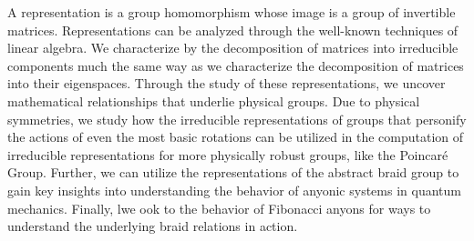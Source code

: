A representation is a group homomorphism whose image is a group of invertible matrices. Representations can be analyzed through the well-known techniques of linear algebra. We characterize by the decomposition of matrices into irreducible components much the same way as we characterize the decomposition of matrices into their eigenspaces. Through the study of these representations, we uncover mathematical relationships that underlie physical groups. Due to physical symmetries, we study how the irreducible representations of groups that personify the actions of even the most basic rotations can be utilized in the computation of irreducible representations for more physically robust groups, like the Poincar\'e Group. Further, we can utilize the representations of the abstract braid group to gain key insights into understanding the behavior of anyonic systems in quantum mechanics. Finally, lwe ook to the behavior of Fibonacci anyons for ways to understand the underlying braid relations in action.